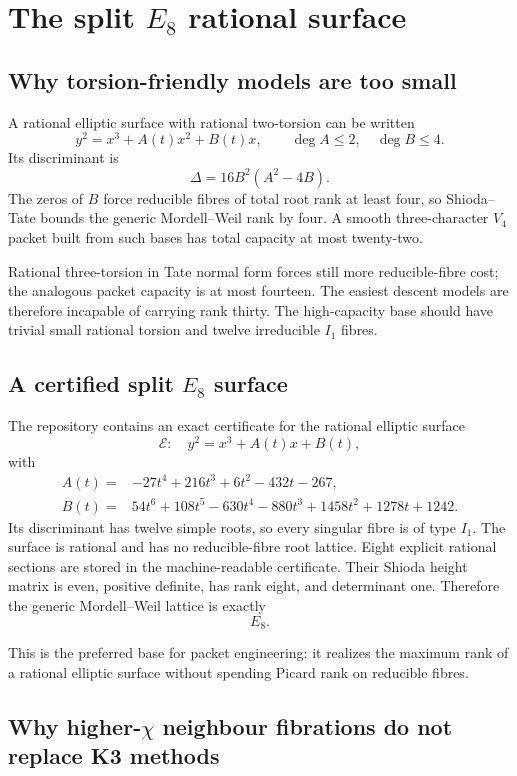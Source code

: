 \section{The split $E_8$ rational surface}

\subsection{Why torsion-friendly models are too small}

A rational elliptic surface with rational two-torsion can be written
\[
y^2=x^3+A(t)x^2+B(t)x,
\qquad \deg A\le2,\quad \deg B\le4.
\]
Its discriminant is
\[
\Delta=16B^2(A^2-4B).
\]
The zeros of $B$ force reducible fibres of total root rank at least four, so
Shioda--Tate bounds the generic Mordell--Weil rank by four.  A smooth
three-character $V_4$ packet built from such bases has total capacity at most
twenty-two.

Rational three-torsion in Tate normal form forces still more reducible-fibre
cost; the analogous packet capacity is at most fourteen.  The easiest descent
models are therefore incapable of carrying rank thirty.  The high-capacity
base should have trivial small rational torsion and twelve irreducible
$I_1$ fibres.

\subsection{A certified split $E_8$ surface}

The repository contains an exact certificate for the rational elliptic
surface
\[
\mathcal E:\quad y^2=x^3+A(t)x+B(t),
\]
with
\[
\begin{aligned}
A(t)={}&-27t^4+216t^3+6t^2-432t-267,\\
B(t)={}&54t^6+108t^5-630t^4-880t^3+1458t^2+1278t+1242.
\end{aligned}
\]
Its discriminant has twelve simple roots, so every singular fibre is of type
$I_1$.  The surface is rational and has no reducible-fibre root lattice.
Eight explicit rational sections are stored in the machine-readable
certificate.  Their Shioda height matrix is even, positive definite, has
rank eight, and determinant one.  Therefore the generic Mordell--Weil lattice
is exactly
\[
\boxed{E_8.}
\]

This is the preferred base for packet engineering: it realizes the maximum
rank of a rational elliptic surface without spending Picard rank on reducible
fibres.

\subsection{Why higher-$\chi$ neighbour fibrations do not replace K3 methods}

